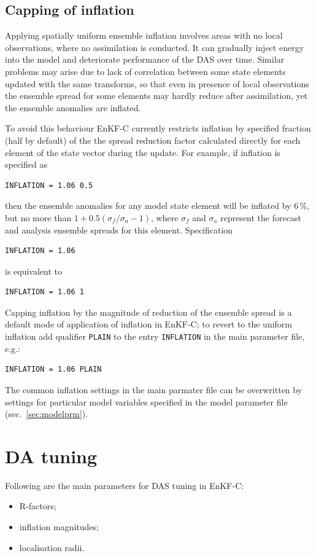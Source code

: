 \documentclass[11pt]{report}
\begin{document}
\subsection{Capping of inflation}
\label{sec:capping}

Applying spatially uniform ensemble inflation involves areas with no local observations, where no assimilation is conducted.
It can gradually inject energy into the model and deteriorate performance of the DAS over time.
Similar problems may arise due to lack of correlation between some state elements updated with the same transforms, so that even in presence of local observations the ensemble spread for some elements may hardly reduce after assimilation, yet the ensemble anomalies are inflated.

To avoid this behaviour EnKF-C currently restricts inflation by specified fraction (half by default) of the the spread reduction factor calculated directly for each element of the state vector during the update.
For example, if inflation is specified as
\begin{Verbatim}
INFLATION = 1.06 0.5
\end{Verbatim}
then the ensemble anomalies for any model state element will be inflated by 6\,\%, but no more than $1 + 0.5 (\sigma_f / \sigma_a - 1)$, where $\sigma_f$ and $\sigma_a$ represent the forecast and analysis ensemble spreads for this element.
Specification
\begin{Verbatim}
INFLATION = 1.06
\end{Verbatim}
is equivalent to
\begin{Verbatim}
INFLATION = 1.06 1
\end{Verbatim}
Capping inflation by the magnitude of reduction of the ensemble spread is a default mode of application of inflation in EnKF-C; to revert to the uniform inflation add qualifier \verb|PLAIN| to the entry \verb|INFLATION| in the main parameter file, e.g.:
\begin{Verbatim}
INFLATION = 1.06 PLAIN
\end{Verbatim}
The common inflation settings in the main parmater file can be overwritten by settings for particular model variables specified in the model parameter file (sec.~\ref{sec:modelprm}).

\section{DA tuning}
\label{sec:datuning}

Following are the main parameters for DAS tuning in EnKF-C:
\begin{itemize}
\item R-factors;
\item inflation magnitudes;
\item localisation radii.
\end{itemize}
\end{document}
